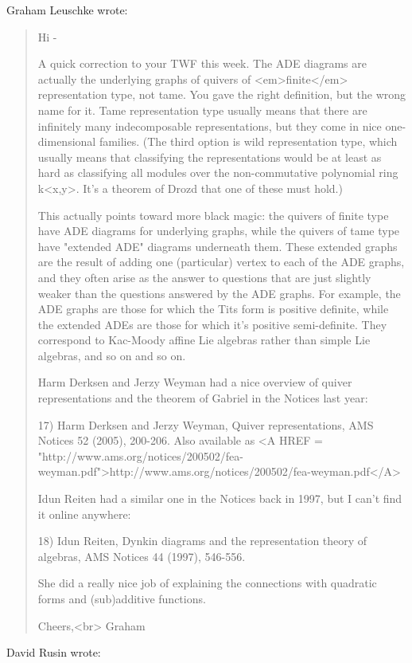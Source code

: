 Graham Leuschke wrote:

\begin{quote}
  Hi - 

  A quick correction to your TWF this week.  The ADE diagrams are 
  actually the underlying graphs of quivers of <em>finite</em> representation 
  type, not tame.  You gave the right definition, but the wrong name 
  for it.  Tame representation type usually means that there are 
  infinitely many indecomposable representations, but they come in 
  nice one-dimensional families.  (The third option is wild representation 
  type, which usually means that classifying the representations would 
  be at least as hard as classifying all modules over the non-commutative 
  polynomial ring k<x,y>.  It's a theorem of Drozd that one of these must 
  hold.)

  This actually points toward more black magic: the quivers of finite type 
  have ADE diagrams for underlying graphs, while the quivers of tame type 
  have "extended ADE" diagrams underneath them.  These extended graphs 
  are the result of adding one (particular) vertex to each of the ADE 
  graphs, and they often arise as the answer to questions that are just 
  slightly weaker than the questions answered by the ADE graphs.  For 
  example, the ADE graphs are those for which the Tits form is positive 
  definite, while the extended ADEs are those for which it's positive 
  semi-definite.    They correspond to Kac-Moody affine Lie algebras 
  rather than simple Lie algebras, and so on and so on.

  Harm Derksen and Jerzy Weyman had a nice overview of quiver 
  representations and the theorem of Gabriel in the Notices last year:

  17) Harm Derksen and Jerzy Weyman, Quiver representations, 
  AMS Notices 52 (2005), 200-206.  Also available as
  <A HREF = "http://www.ams.org/notices/200502/fea-weyman.pdf">http://www.ams.org/notices/200502/fea-weyman.pdf</A>

  Idun Reiten had a similar one in the Notices back in 1997, but I 
  can't find it online anywhere:

  18) Idun Reiten, Dynkin diagrams and the representation theory of 
  algebras, AMS Notices 44 (1997), 546-556.

  She did a really nice job of explaining the connections with 
  quadratic forms and (sub)additive functions.

  Cheers,<br>
  Graham
\end{quote}
    

David Rusin wrote:



